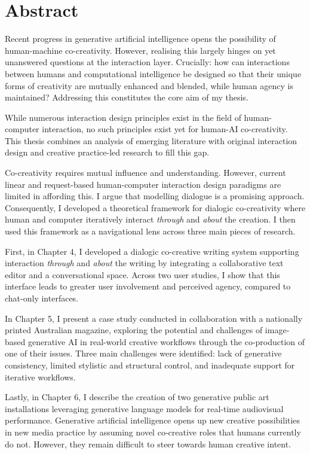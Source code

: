 \chapter{Abstract}

Recent progress in generative artificial intelligence opens the possibility of human-machine co-creativity. However, realising this largely hinges on yet unanswered questions at the interaction layer. Crucially: how can interactions between humans and computational intelligence be designed so that their unique forms of creativity are mutually enhanced and blended, while human agency is maintained? Addressing this constitutes the core aim of my thesis.

While numerous interaction design principles exist in the field of human-computer interaction, no such principles exist yet for human-AI co-creativity. This thesis combines an analysis of emerging literature with original interaction design and creative practice-led research to fill this gap. 

Co-creativity requires mutual influence and understanding. However, current linear and request-based human-computer interaction design paradigms are limited in affording this. I argue that modelling dialogue is a promising approach. Consequently, I developed a theoretical framework for dialogic co-creativity where human and computer iteratively interact \textit{through} and \textit{about} the creation.  I then used this framework as a navigational lens across three main pieces of research. 

First, in Chapter 4, I developed a dialogic co-creative writing system supporting interaction \textit{through} and \textit{about} the writing by integrating a collaborative text editor and a conversational space. Across two user studies, I show that this interface leads to greater user involvement and perceived agency, compared to chat-only interfaces.  

In Chapter 5, I present a case study conducted in collaboration with a nationally printed Australian magazine, exploring the potential and challenges of image-based generative AI in real-world creative workflows through the co-production of one of their issues. Three main challenges were identified: lack of generative consistency, limited stylistic and structural control, and inadequate support for iterative workflows. 

Lastly, in Chapter 6, I describe the creation of two generative public art installations leveraging generative language models for real-time audiovisual performance. Generative artificial intelligence opens up new creative possibilities in new media practice by assuming novel co-creative roles that humans currently do not. However, they remain difficult to steer towards human creative intent. 

